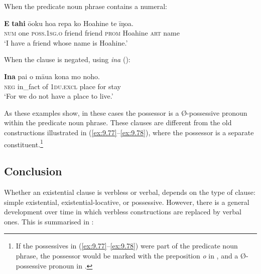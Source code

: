 When the predicate noun phrase contains a numeral:

\ea\label{ex:9.79}
\gll \textbf{E} \textbf{tahi} ō{\ꞌ}oku hoa repa ko Hoahine te {\ꞌ}īŋoa.\\
\textsc{num} one \textsc{poss.1sg.o} friend friend \textsc{prom} Hoahine \textsc{art} name\\

\glt
‘I have a friend whose name is Hoahine.’ \textstyleExampleref{[R213.014]} 
\z

When the clause is negated, using \textit{{\ꞌ}ina} ():

\ea\label{ex:9.80}
\gll {\ꞌ}\textbf{Ina} pa{\ꞌ}i o māua kona mo noho. \\
\textsc{neg} in\_fact of \textsc{1du.excl} place for stay \\

\glt
‘For we do not have a place to live.’ \textstyleExampleref{[R229.210]} 
\z

As these examples show, in these cases the possessor is a Ø-possessive pronoun within the predicate noun phrase. These clauses are different from the old constructions illustrated in (\ref{ex:9.77}–\ref{ex:9.78}), where the possessor is a separate constituent.\footnote{\label{fn:478}If the possessives in (\ref{ex:9.77}–\ref{ex:9.78}) were part of the predicate noun phrase, the possessor would be marked with the preposition \textit{o} in , and a Ø-possessive pronoun in .} 
\subsection{Conclusion}\label{sec:9.3.4}

Whether an existential clause is verbless or verbal, depends on the type of clause: simple existential, existential-locative, or possessive. However, there is a general development over time in which verbless constructions are replaced by verbal ones. This is summarised in :

\newpage
\begin{table}
\caption{Types of existential clauses}
\label{tab:63}
\end{table}

